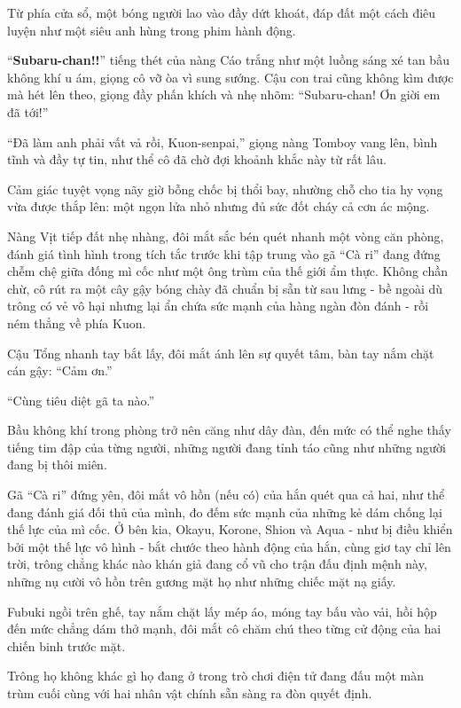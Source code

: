 \documentclass[../main.tex]{subfiles}
\begin{document}
Từ phía cửa sổ, một bóng người lao vào đầy dứt khoát, đáp đất một cách điêu luyện như một siêu anh hùng trong phim hành động.

``\textbf{Subaru-chan!!}'' tiếng thét của nàng Cáo trắng như một luồng sáng xé tan bầu không khí u ám, giọng cô vỡ òa vì sung sướng. Cậu con trai cũng không kìm được mà hét lên theo, giọng đầy phấn khích và nhẹ nhõm: ``Subaru-chan! Ơn giời em đã tới!''

``Đã làm anh phải vất vả rồi, Kuon-senpai,'' giọng nàng Tomboy vang lên, bình tĩnh và đầy tự tin, như thể cô đã chờ đợi khoảnh khắc này từ rất lâu.

Cảm giác tuyệt vọng nãy giờ bỗng chốc bị thổi bay, nhường chỗ cho tia hy vọng vừa được thắp lên: một ngọn lửa nhỏ nhưng đủ sức đốt cháy cả cơn ác mộng.

Nàng Vịt tiếp đất nhẹ nhàng, đôi mắt sắc bén quét nhanh một vòng căn phòng, đánh giá tình hình trong tích tắc trước khi tập trung vào gã ``Cà ri'' đang đứng chễm chệ giữa đống mì cốc như một ông trùm của thế giới ẩm thực. Không chần chừ, cô rút ra một cây gậy bóng chày đã chuẩn bị sẵn từ sau lưng - bề ngoài dù trông có vẻ vô hại nhưng lại ẩn chứa sức mạnh của hàng ngàn đòn đánh - rồi ném thẳng về phía Kuon.

Cậu Tổng nhanh tay bắt lấy, đôi mắt ánh lên sự quyết tâm, bàn tay nắm chặt cán gậy: ``Cảm ơn.''

``Cùng tiêu diệt gã ta nào.''

Bầu không khí trong phòng trở nên căng như dây đàn, đến mức có thể nghe thấy tiếng tim đập của từng người, những người đang tỉnh táo cũng như những người đang bị thôi miên.

Gã ``Cà ri'' đứng yên, đôi mắt vô hồn (nếu có) của hắn quét qua cả hai, như thể đang đánh giá đối thủ của mình, đo đếm sức mạnh của những kẻ dám chống lại thế lực của mì cốc. Ở bên kia, Okayu, Korone, Shion và Aqua - như bị điều khiển bởi một thế lực vô hình - bắt chước theo hành động của hắn, cùng giơ tay chỉ lên trời, trông chẳng khác nào khán giả đang cổ vũ cho trận đấu định mệnh này, những nụ cười vô hồn trên gương mặt họ như những chiếc mặt nạ giấy.

Fubuki ngồi trên ghế, tay nắm chặt lấy mép áo, móng tay bấu vào vải, hồi hộp đến mức chẳng dám thở mạnh, đôi mắt cô chăm chú theo từng cử động của hai chiến binh trước mặt.

Trông họ không khác gì họ đang ở trong trò chơi điện tử đang đấu một màn trùm cuối cùng với hai nhân vật chính sẵn sàng ra đòn quyết định.
\end{document}
